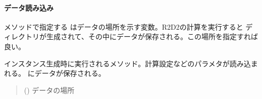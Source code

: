 \documentclass[letterpaper,10pt,dvipdfmx,report]{sphinxmanual}
\begin{document}
\paragraph{データ読み込み}
\label{\detokenize{io:id5}}
\sphinxAtStartPar
メソッドで指定する  はデータの場所を示す変数。R2D2の計算を実行すると  ディレクトリが生成されて、その中にデータが保存される。この場所を指定すれば良い。

\begin{fulllineitems}
\label{\detokenize{io:R2D2.R2D2_data.__init__}}
\pysigstartsignatures
{}
\pysigstopsignatures
\sphinxAtStartPar
インスタンス生成時に実行されるメソッド。計算設定などのパラメタが読み込まれる。 {\hyperref[\detokenize{io:R2D2.R2D2_data.p}]{}} にデータが保存される。
\begin{quote}\begin{description}
\sphinxAtStartPar
{} () \sphinxhyphen{}\sphinxhyphen{} データの場所

\end{description}\end{quote}

\end{fulllineitems}

\end{document}
